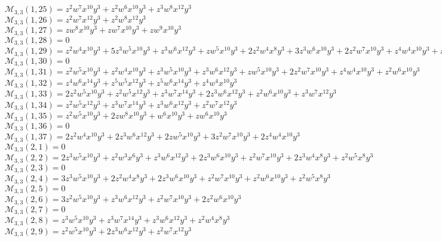 \documentclass[12pt]{memoireuqam1.3}
\begin{document}
$\mathcal{M}_{3,3}(1,25)=z^2w^7x^{10}y^3+z^2w^6x^{10}y^3+z^3w^8x^{12}y^3$\\
$\mathcal{M}_{3,3}(1,26)=z^2w^7x^{12}y^3+z^2w^8x^{12}y^3$\\
$\mathcal{M}_{3,3}(1,27)=zw^8x^{10}y^3+zw^7x^{10}y^3+zw^9x^{10}y^3$\\
$\mathcal{M}_{3,3}(1,28)=0$\\
$\mathcal{M}_{3,3}(1,29)=z^2w^4x^{10}y^3+5z^3w^5x^{10}y^3+z^3w^6x^{12}y^3+zw^5x^{10}y^3+2z^2w^4x^8y^3+3z^3w^6x^{10}y^3+2z^2w^7x^{10}y^3+z^4w^4x^{10}y^3+z^2w^5x^8y^3$\\
$\mathcal{M}_{3,3}(1,30)=0$\\
$\mathcal{M}_{3,3}(1,31)=z^2w^5x^{10}y^3+z^2w^4x^{10}y^3+z^3w^5x^{10}y^3+z^3w^6x^{12}y^3+zw^5x^{10}y^3+2z^2w^7x^{10}y^3+z^4w^4x^{10}y^3+z^2w^6x^{10}y^3$\\
$\mathcal{M}_{3,3}(1,32)=z^4w^6x^{14}y^3+z^5w^5x^{12}y^3+z^5w^6x^{14}y^3+z^4w^4x^{10}y^3$\\
$\mathcal{M}_{3,3}(1,33)=2z^2w^5x^{10}y^3+z^2w^5x^{12}y^3+z^3w^7x^{14}y^3+2z^3w^6x^{12}y^3+z^2w^6x^{10}y^3+z^3w^7x^{12}y^3$\\
$\mathcal{M}_{3,3}(1,34)=z^2w^5x^{12}y^3+z^3w^7x^{14}y^3+z^3w^6x^{12}y^3+z^2w^7x^{12}y^3$\\
$\mathcal{M}_{3,3}(1,35)=z^2w^5x^{10}y^3+2zw^8x^{10}y^3+w^6x^{10}y^3+zw^6x^{10}y^3$\\
$\mathcal{M}_{3,3}(1,36)=0$\\
$\mathcal{M}_{3,3}(1,37)=2z^2w^4x^{10}y^3+2z^3w^6x^{12}y^3+2zw^5x^{10}y^3+3z^2w^7x^{10}y^3+2z^4w^4x^{10}y^3$\\
$\mathcal{M}_{3,3}(2,1)=0$\\
$\mathcal{M}_{3,3}(2,2)=2z^3w^5x^{10}y^3+z^2w^3x^6y^3+z^3w^6x^{12}y^3+2z^3w^6x^{10}y^3+z^2w^7x^{10}y^3+2z^3w^4x^8y^3+z^2w^5x^8y^3$\\
$\mathcal{M}_{3,3}(2,3)=0$\\
$\mathcal{M}_{3,3}(2,4)=3z^3w^5x^{10}y^3+2z^2w^4x^8y^3+2z^3w^6x^{10}y^3+z^2w^7x^{10}y^3+z^2w^6x^{10}y^3+z^2w^5x^8y^3$\\
$\mathcal{M}_{3,3}(2,5)=0$\\
$\mathcal{M}_{3,3}(2,6)=3z^2w^5x^{10}y^3+z^3w^6x^{12}y^3+z^2w^7x^{10}y^3+2z^2w^6x^{10}y^3$\\
$\mathcal{M}_{3,3}(2,7)=0$\\
$\mathcal{M}_{3,3}(2,8)=z^3w^5x^{10}y^3+z^3w^7x^{14}y^3+z^3w^6x^{12}y^3+z^2w^4x^8y^3$\\
$\mathcal{M}_{3,3}(2,9)=z^2w^5x^{10}y^3+2z^3w^6x^{12}y^3+z^2w^7x^{12}y^3$\\
\end{document}
